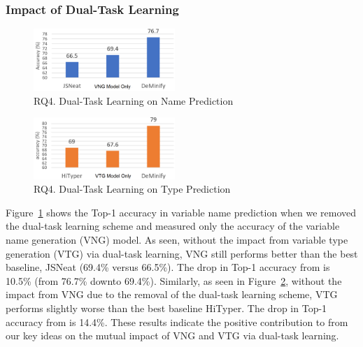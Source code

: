 \subsubsection{Impact of Dual-Task Learning}
\label{sec:dual-task-result}


\begin{figure}[t]%
\begin{center}
\includegraphics[width=2.1in]{figures/dual-task-result-111}
\vspace{-8pt}
\caption{RQ4. Dual-Task Learning on Name Prediction}
\label{dual-task-result-1}
\end{center}
\end{figure}

\begin{figure}[t]%
\begin{center}
\includegraphics[width=2.1in]{figures/dual-task-result-222}
\vspace{-8pt}
\caption{RQ4. Dual-Task Learning on Type Prediction}
\label{dual-task-result-2}
\end{center}
\end{figure}

Figure~\ref{dual-task-result-1} shows the Top-1 accuracy in variable
name prediction when we removed the dual-task learning scheme and
measured only the accuracy of the variable name generation (VNG)
model.  As seen, without the impact from variable type generation
(VTG) via dual-task learning, VNG still performs better than the best
baseline, JSNeat (69.4\% versus 66.5\%). The drop in Top-1 accuracy
from {\tool} is 10.5\% (from 76.7\% downto 69.4\%). Similarly, as seen
in Figure~\ref{dual-task-result-2}, without the impact from VNG due to
the removal of the dual-task learning scheme, VTG performs slightly
worse than the best baseline HiTyper. The drop in Top-1 accuracy from
{\tool} is 14.4\%.  These results indicate the positive contribution to {\tool}
from our key ideas on the mutual impact of VNG and VTG via dual-task
learning.
